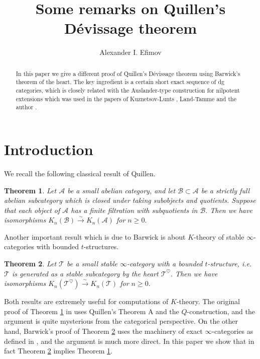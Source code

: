 \documentclass[11pt,leqno]{amsart}
\title[Some remarks on Quillen's D\'evissage theorem]
{Some remarks on Quillen's D\'evissage theorem}
\author{Alexander I. Efimov}
\newtheorem{theo}{Theorem}[section]
\numberwithin{equation}{section}
\newcommand{\xto}{\xrightarrow}
\newcommand{\cA}{{\mathcal A}}
\newcommand{\cB}{{\mathcal B}}
\newcommand{\cT}{{\mathcal T}}
\begin{document}
\begin{abstract} In this paper we give a different proof of Quillen's D\'evissage theorem using Barwick's theorem of the heart. The key ingredient is a certain short exact sequence of dg categories, which is closely related with the Auslander-type construction for nilpotent extensions which was used in the papers of Kuznetsov-Lunts \cite{KL15}, Land-Tamme \cite{LT19} and the author \cite{E20}.
\end{abstract}


\maketitle

\tableofcontents

\section{Introduction}
\label{sec:intro}

We recall the following classical result of Quillen.

\begin{theo}\label{th:Quillen} \cite[Theorem 4]{Qui}
Let $\cA$ be a small abelian category, and let $\cB\subset\cA$ be a strictly full abelian subcategory which is closed under taking subobjects and quotients. Suppose that each object of $\cA$ has a finite filtration with subquotients in $\cB.$ Then we have isomorphisms $K_n(\cB)\xto{\sim}K_n(\cA)$ for $n\geq 0.$
\end{theo}

Another important result which is due to Barwick is about $K$-theory of stable $\infty$-categories with bounded $t$-structures.

\begin{theo}\label{th:Barwick} \cite[Theorem 6.1]{Bar15}
Let $\cT$ be a small stable $\infty$-category with a bounded $t$-structure, i.e. $\cT$ is generated as a stable subcategory by the heart $\cT^{\heartsuit}.$ Then we have isomorphisms $K_n(\cT^{\heartsuit})\xto{\sim} K_n(\cT)$ for $n\geq 0.$
\end{theo}
 
Both results are extremely useful for computations of $K$-theory. The original proof of Theorem \ref{th:Quillen} in \cite{Qui} uses Quillen's Theorem A and the $Q$-construction, and the argument is quite mysterious from the categorical perspective. On the other hand, Barwick's proof of Theorem \ref{th:Barwick} uses the machinery of exact $\infty$-categories as defined in \cite{Bar15}, and the argument is much more direct. In this paper we show that in fact Theorem \ref{th:Barwick} implies Theorem \ref{th:Quillen}.
\end{document}
